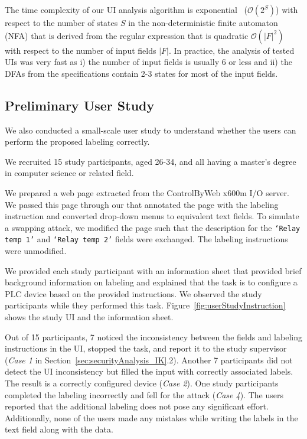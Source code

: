 The time complexity of our UI analysis algorithm is exponential~\cite{Salomaa1997} ($\mathcal{O}(2^S)$) with respect to the number of states $S$ in the non-deterministic finite automaton (NFA) that is derived from the regular expression that is quadratic $\mathcal{O}(|F|^2)$ with respect to the number of input fields $|F|$. In practice, the analysis of tested UIs was very fast as i) the number of input fields is usually 6 or less and ii) the DFAs from the specifications contain 2-3 states for most of the input fields.



\subsection{Preliminary User Study}
\label{sec:results:userStudy}

We also conducted a small-scale user study to understand whether the users can perform the proposed labeling correctly. 

 We recruited 15 study participants, aged 26-34, and all having a master's degree in computer science or related field.

 We prepared a web page extracted from the ControlByWeb x600m I/O server. We passed this page through our \tool that annotated the page with the labeling instruction and converted drop-down menus to equivalent text fields. To simulate a swapping attack, we modified the page such that the description for the \texttt{`Relay temp 1'} and \texttt{`Relay temp 2'} fields were exchanged. The labeling instructions were unmodified.

We provided each study participant with an information sheet that provided brief background information on labeling and explained that the task is to configure a PLC device based on the provided instructions. We observed the study participants while they performed this task. 
Figure~\ref{fig:userStudyInstruction} shows the study UI and the information sheet.

 Out of 15 participants, 7 noticed the inconsistency between the fields and labeling instructions in the UI, stopped the task, and report it to the study supervisor (\emph{Case 1} in Section~\ref{sec:securityAnalysis_IK}.2). Another 7 participants did not detect the UI inconsistency but filled the input with correctly associated labels. The result is a correctly configured device (\emph{Case 2}). One study participants completed the labeling incorrectly and fell for the attack (\emph{Case 4}). The users reported that the additional labeling does not pose any significant effort. Additionally, none of the users made any mistakes while writing the labels in the text field along with the data. 

